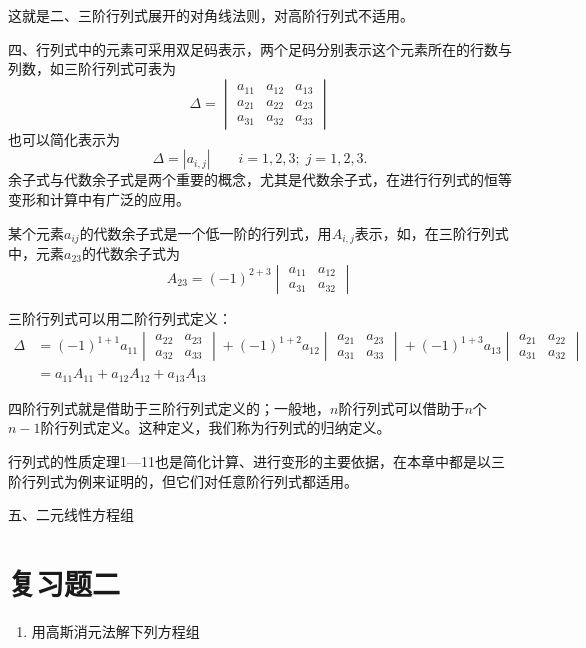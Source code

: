 这就是二、三阶行列式展开的对角线法则，对高阶行列式不适用。

四、行列式中的元素可采用双足码表示，两个足码分别表示这个元素所在的行数与列数，如三阶行列式可表为
\[\Delta =\begin{vmatrix}
    a_{11}&a_{12}&a_{13}\\a_{21}&a_{22}&a_{23}\\a_{31}&a_{32}&a_{33}
\end{vmatrix}\]
也可以简化表示为
\[\Delta =|a_{i,j}|\qquad i=1,2,3;\; j=1,2,3.\]
余子式与代数余子式是两个重要的概念，尤其是代数余子式，在进行行列式的恒等变形和计算中有广泛的应用。

某个元素$a_{ij}$的代数余子式是一个低一阶的行列式，用$A_{i,j}$表示，如，在三阶行列式中，元素$a_{23}$的代数余子式为
\[A_{23}=(-1)^{2+3}\begin{vmatrix}
    a_{11}&a_{12}\\a_{31}&a_{32}
\end{vmatrix}\]

三阶行列式可以用二阶行列式定义：
\[\begin{split}
\Delta&=(-1)^{1+1}a_{11}\begin{vmatrix}
    a_{22}&a_{23}\\a_{32}&a_{33}
\end{vmatrix}+(-1)^{1+2}a_{12}\begin{vmatrix}
    a_{21}&a_{23}\\a_{31}&a_{33}
\end{vmatrix}+(-1)^{1+3}a_{13}\begin{vmatrix}
    a_{21}&a_{22}\\a_{31}&a_{32}
\end{vmatrix}\\
&=a_{11}A_{11}+a_{12}A_{12}+a_{13}A_{13}
\end{split}\]

四阶行列式就是借助于三阶行列式定义的；一般地，$n$阶行列式可以借助于$n$个$n-1$阶行列式定义。这种定义，我们称为行列式的归纳定义。

行列式的性质定理1—11也是简化计算、进行变形的主要依据，在本章中都是以三阶行列式为例来证明的，但它们对任意阶行列式都适用。

五、二元线性方程组














\section*{复习题二}
\begin{enumerate}
    \item 用高斯消元法解下列方程组











\end{enumerate}